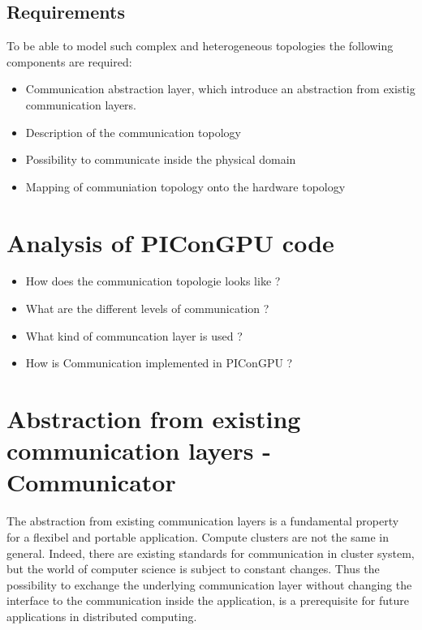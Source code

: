 \subsection{Requirements}
To be able to model such complex and heterogeneous topologies the
following components are required:

\begin{itemize}
\item Communication abstraction layer, which introduce an abstraction
  from existig communication layers.
\item Description of the communication topology
\item Possibility to communicate inside the physical domain
\item Mapping of communiation topology onto the hardware topology
\end{itemize}

\section{Analysis of PIConGPU code}
\begin{itemize}
  \item How does the communication topologie looks like ?
  \item What are the different levels of communication ?
  \item What kind of communcation layer is used ?
  \item How is Communication implemented in PIConGPU ?
\end{itemize}

\section{Abstraction from existing communication layers - Communicator}
The abstraction from existing communication layers is a fundamental
property for a flexibel and portable application. Compute clusters are
not the same in general. Indeed, there are existing standards for
communication in cluster system, but the world of computer science is
subject to constant changes. Thus the possibility to exchange the
underlying communication layer without changing the interface to the
communication inside the application, is a prerequisite for future
applications in distributed computing.

